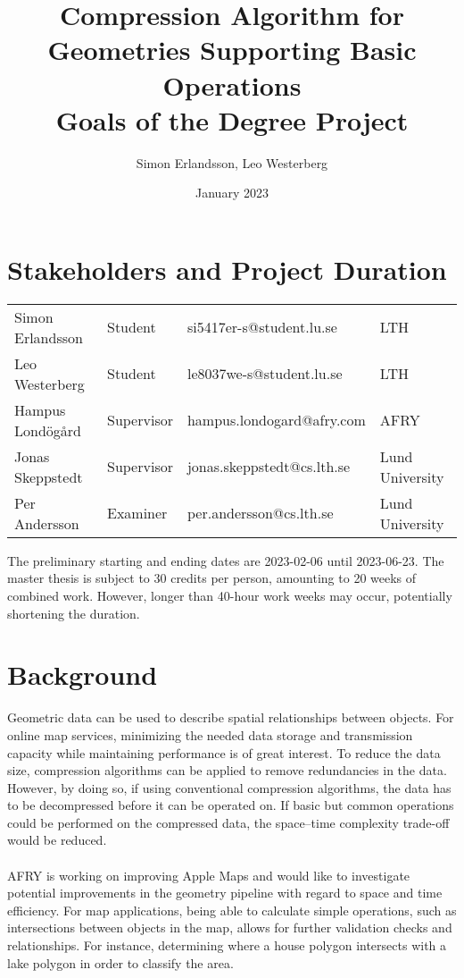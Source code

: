 \documentclass{article}
\title{Compression Algorithm for Geometries Supporting Basic Operations \\
  \large Goals of the Degree Project }
\author{Simon Erlandsson, Leo Westerberg }
\date{January 2023}
\begin{document}
\maketitle

\section{Stakeholders and Project Duration}
\begin{table}[h]
\begin{tabular}{llll}
Simon Erlandsson & Student    & si5417er-s@student.lu.se   & LTH             \\
Leo Westerberg   & Student    & le8037we-s@student.lu.se   & LTH             \\
Hampus Londögård & Supervisor & hampus.londogard@afry.com  & AFRY            \\
Jonas Skeppstedt & Supervisor & jonas.skeppstedt@cs.lth.se & Lund University \\
Per Andersson    & Examiner   & per.andersson@cs.lth.se    & Lund University
\end{tabular}
\end{table}

\noindent
The preliminary starting and ending dates are 2023-02-06 until 2023-06-23. The master thesis is subject to 30 credits per person, amounting to 20 weeks of combined work. However, longer than 40-hour work weeks may occur, potentially shortening the duration.


\section{Background}
Geometric data can be used to describe spatial relationships between objects. For online map services, minimizing the needed data storage and transmission capacity while maintaining performance is of great interest. To reduce the data size, compression algorithms can be applied to remove redundancies in the data. However, by doing so, if using conventional compression algorithms, the data has to be decompressed before it can be operated on. If basic but common operations could be performed on the compressed data, the space–time complexity trade-off would be reduced.
\\\\
AFRY is working on improving Apple Maps and would like to investigate potential improvements in the geometry pipeline with regard to space and time efficiency. For map applications, being able to calculate simple operations, such as intersections between objects in the map, allows for further validation checks and relationships. For instance, determining where a house polygon intersects with a lake polygon in order to classify the area.
\end{document}
